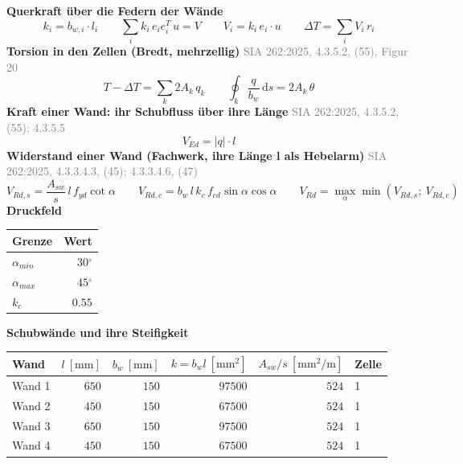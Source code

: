 \documentclass[11pt,a4paper]{article}
\newcommand{\normref}[1]{{\small\textcolor{gray}{#1}}}
\begin{document}
\noindent\textbf{Querkraft über die Federn der Wände}
\begin{equation*}
k_i = b_{w,i} \cdot l_i \qquad \sum_i k_i\, e_i e_i^T\, u = V \qquad V_i = k_i\, e_i \cdot u \qquad \Delta T = \sum_i V_i\, r_i
\end{equation*}
\noindent\textbf{Torsion in den Zellen (Bredt, mehrzellig)} \hfill \normref{SIA 262:2025, 4.3.5.2, (55), Figur 20}
\begin{equation*}
T - \Delta T = \sum_k 2 A_k\, q_k \qquad \oint_k \frac{q}{b_w}\, \mathrm{d}s = 2 A_k\, \theta
\end{equation*}
\noindent\textbf{Kraft einer Wand: ihr Schubfluss über ihre Länge} \hfill \normref{SIA 262:2025, 4.3.5.2, (55); 4.3.5.5}
\begin{equation*}
V_{Ed} = |q| \cdot l
\end{equation*}
\noindent\textbf{Widerstand einer Wand (Fachwerk, ihre Länge l als Hebelarm)} \hfill \normref{SIA 262:2025, 4.3.3.4.3, (45); 4.3.3.4.6, (47)}
\begin{equation*}
V_{Rd,s} = \frac{A_{sw}}{s}\, l\, f_{yd} \cot\alpha \qquad V_{Rd,c} = b_w\, l\, k_c\, f_{cd} \sin\alpha \cos\alpha \qquad V_{Rd} = \max_\alpha \min(V_{Rd,s};\ V_{Rd,c})
\end{equation*}
\noindent\textbf{Druckfeld}
\begin{longtable}{lr}
\hline
Grenze & Wert \\
\hline
\endhead
$\alpha_{min}$ & $30{}^{\circ}$ \\
$\alpha_{max}$ & $45{}^{\circ}$ \\
$k_c$ & $0.55$ \\
\hline
\end{longtable}
\noindent\textbf{Schubwände und ihre Steifigkeit}
\begin{longtable}{lrrrrl}
\hline
Wand & $l\ [\mathrm{mm}]$ & $b_w\ [\mathrm{mm}]$ & $k = b_w l\ [\mathrm{mm}^2]$ & $A_{sw}/s\ [\mathrm{mm^2/m}]$ & Zelle \\
\hline
\endhead
Wand 1 & $650$ & $150$ & $97500$ & $524$ & 1 \\
Wand 2 & $450$ & $150$ & $67500$ & $524$ & 1 \\
Wand 3 & $650$ & $150$ & $97500$ & $524$ & 1 \\
Wand 4 & $450$ & $150$ & $67500$ & $524$ & 1 \\
\hline
\end{longtable}
\end{document}
